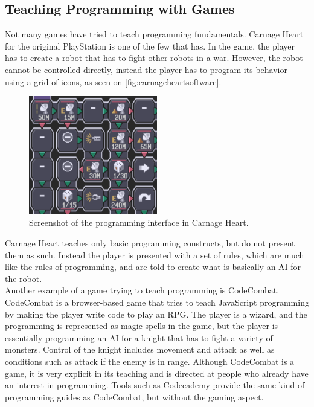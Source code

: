 \subsection{Teaching Programming with Games}
Not many games have tried to teach programming fundamentals. Carnage Heart for the original PlayStation is one of the few that has. In the game, the player has to create a robot that has to fight other robots in a war. However, the robot cannot be controlled directly, instead the player has to program its behavior using a grid of icons, as seen on \autoref{fig:carnageheartsoftware}.

\begin{figure}[hptb]
  \centering
    \includegraphics[width=0.5\textwidth]{img/CarnageHeartSoftware.png}
  \caption{Screenshot of the programming interface in Carnage Heart.\cite{carnageheartsoftware}}
  \label{fig:carnageheartsoftware}
\end{figure}

Carnage Heart teaches only basic programming constructs, but do not present them as such. Instead the player is presented with a set of rules, which are much like the rules of programming, and are told to create what is basically an AI for the robot.\\

Another example of a game trying to teach programming is CodeCombat. \cite{codecombat} CodeCombat is a browser-based game that tries to teach JavaScript programming by making the player write code to play an RPG. The player is a wizard, and the programming is represented as magic spells in the game, but the player is essentially programming an AI for a knight that has to fight a variety of monsters. Control of the knight includes movement and attack as well as conditions such as attack if the enemy is in range.
Although CodeCombat is a game, it is very explicit in its teaching and is directed at people who already have an interest in programming. Tools such as Codecademy provide the same kind of programming guides as CodeCombat, but without the gaming aspect.\cite{codecademy}\\


